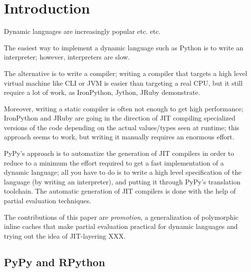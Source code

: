 \section{Introduction}

Dynamic languages are increasingly popular etc. etc.

The easiest way to implement a dynamic language such as Python is to write an
interpreter; however, interpreters are slow.

The alternative is to write a compiler; writing a compiler that targets a high
level virtual machine like CLI or JVM is easier than targeting a real CPU, but
it still require a lot of work, as IronPython, Jython, JRuby demonstrate.

Moreover, writing a static compiler is often not enough to get high
performance; IronPython and JRuby are going in the direction of JIT compiling
specialized versions of the code depending on the actual values/types seen at
runtime; this approach seems to work, but writing it manually requires an
enormous effort.

PyPy's approach \cite{RiBo07_223} is to automatize the generation of JIT compilers in order
to reduce to a minimum the effort required to get a fast implementation of a
dynamic language; all you have to do is to write a high level specification of
the language (by writing an interpreter), and putting it through PyPy's
translation toolchain. The automatic generation of JIT compilers is done with
the help of partial evaluation techniques.

The contributions of this paper are \emph{promotion}, a generalization of
polymorphic inline caches that make partial evaluation practical for dynamic
languages and trying out the idea of JIT-layering XXX.

\subsection{PyPy and RPython}

